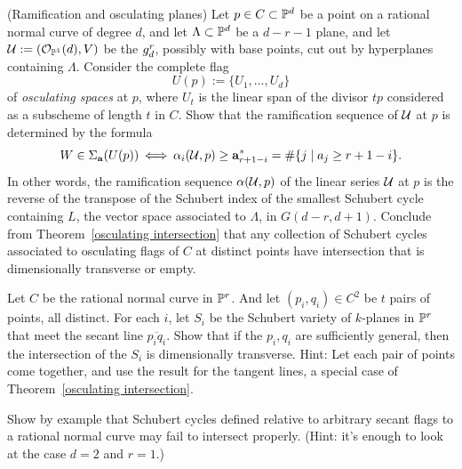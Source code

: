 \begin{exercise}(Ramification and osculating planes)\label{osculating planes}
Let $p\in C\subset \mathbb P^{d}$ be a point on a rational normal curve of degree $d$, and
let $\Lambda\subset \mathbb P^{d}$ be a $d-r-1$ plane, and let  ${\mathcal U} :=({\mathcal O}_{\mathbb P^{1}}(d), V)$
be
the  ${g^{r}_{d}}$,  possibly with base points, cut out by hyperplanes containing $\Lambda$. 
Consider the complete flag 
$$
U(p) := \{U_{1}, \dots, U_{d}\}
$$
of \emph{osculating spaces} at $p$, where $U_{t}$ is the linear span of the divisor $tp$ considered
as a subscheme of length $t$ in $C$. Show that the ramification sequence of ${\mathcal U}$ at $p$
is determined by the formula
$$
W \in \Sigma_{\bf a}({U(p)}) \; \iff \; \alpha_i(\sU, p) \geq {\bf a}^*_{r+1-i} = \#\{j\mid a_j\geq r+1-i\}.
$$
In other words, the ramification sequence $\alpha({\mathcal U}, p)$ of the linear series ${\mathcal U}$ at $p$ is the reverse of the transpose of the Schubert index of the smallest Schubert cycle containing $L$, the vector
space associated to $\Lambda$, in  $G(d-r, d+1)$. Conclude from Theorem~\ref{osculating intersection}
that any collection of Schubert cycles associated to osculating flags of $C$ at distinct points have intersection
that is dimensionally transverse or empty.
\end{exercise}

\begin{exercise}
Let $C$ be the rational normal curve in $\mathbb P^{r}$. And let $(p_{i}, q_{i})\in  C^{2}$ be $t$ pairs of points, all distinct.
For each $i$, let $S_{i}$ be the Schubert variety of $k$-planes in $\mathbb P^{r}$ that meet the secant line
$\overline{p_{i}q_{i}}$. Show that if the $p_{i}, q_{i}$ are sufficiently general, then the intersection
of the $S_{i}$ is dimensionally transverse. Hint: Let each pair of points come together, and use the result
for the tangent lines, a special case of Theorem~\ref{osculating intersection}.
\end{exercise}

\begin{exercise}\label{only general secants}
Show by example that Schubert cycles defined relative to arbitrary secant flags to a rational normal curve may fail to intersect properly. (Hint: it's enough to look at the case $d=2$ and $r=1$.)
\end{exercise}

